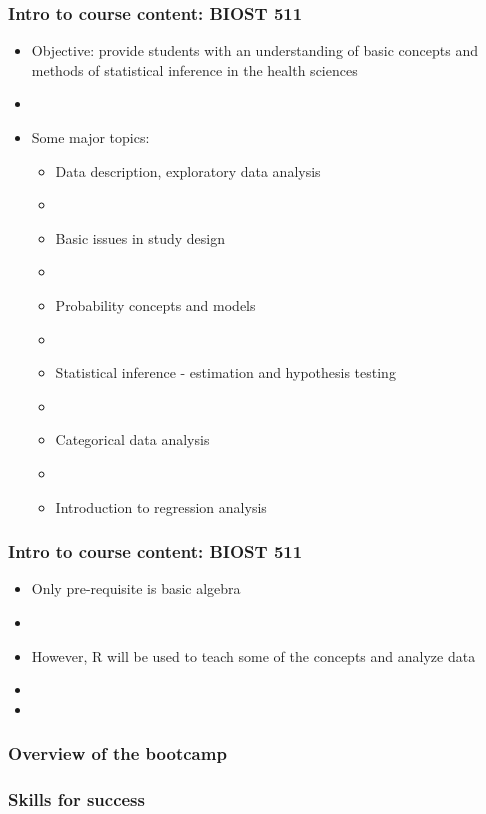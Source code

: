 \documentclass[12pt]{beamer}
\newcommand{\myframe}[1]{\begin{frame} \frametitle{#1}}
\begin{document}
\myframe{Intro to course content: BIOST 511}
\begin{itemize}
\item Objective: provide students with an understanding of basic concepts and methods of statistical inference in the health sciences
\item[]
\item Some major topics:
\begin{itemize}
\item Data description, exploratory data analysis
\item[]
\item Basic issues in study design
\item[]
\item Probability concepts and models
\item[]
\item Statistical inference - estimation and hypothesis testing
\item[]
\item Categorical data analysis
\item[]
\item Introduction to regression analysis
\end{itemize}
\end{itemize}
\end{frame}

\myframe{Intro to course content: BIOST 511}
\begin{itemize}
\item Only pre-requisite is basic algebra
\item[]
\item However, R will be used to teach some of the concepts and analyze data
\item[]
\item 
\end{itemize}
\end{frame}

\myframe{Overview of the bootcamp}

\end{frame}

\myframe{Skills for success}

\end{frame}
\end{document}
